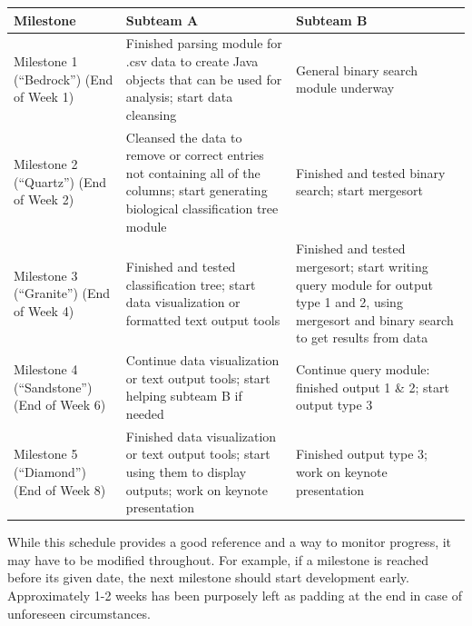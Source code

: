 \documentclass{article}
\begin{document}
\begin{table}[h]
	\centering
	\begin{tabular}{p{0.16\hsize}p{0.38\hsize}p{0.38\hsize}}
		\toprule
		\textbf{Milestone} & \textbf{Subteam A} & \textbf{Subteam B}\\
		\midrule
		Milestone 1 \newline (``Bedrock'') \newline(End of Week 1)
		& Finished parsing module for .csv data to create Java objects that can be used for analysis; start data cleansing
		& General binary search module underway \\
		\midrule
		Milestone 2 \newline (``Quartz'') \newline(End of Week 2)
		& Cleansed the data to remove or correct entries not containing all of the columns; start generating biological classification tree module
		& Finished and tested binary search; start mergesort \\
		\midrule
		Milestone 3 \newline (``Granite'') \newline(End of Week 4)
		& Finished and tested classification tree; start data visualization or formatted text output tools
		& Finished and tested mergesort; start writing query module for output type 1 and 2, using mergesort and binary search to get results from data \\
		\midrule
		Milestone 4 \newline (``Sandstone'') \newline(End of Week 6)
		& Continue data visualization or text output tools; start helping subteam B if needed
		& Continue query module: finished output 1 \& 2; start output type 3\\
		\midrule
		Milestone 5 \newline (``Diamond'') \newline(End of Week 8)
		& Finished data visualization or text output tools; start using them to display outputs; work on keynote presentation
		& Finished output type 3; work on keynote presentation \\		
		\bottomrule
	\end{tabular}
\end{table}

While this schedule provides a good reference and a way to monitor progress, it may have to be modified throughout. For example, if a milestone is reached before its given date, the next milestone should start development early. Approximately 1-2 weeks has been purposely left as padding at the end in case of unforeseen circumstances.

\clearpage


\end{document}
